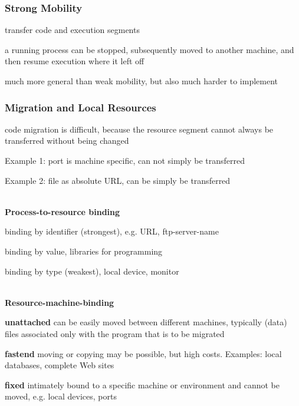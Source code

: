 \subsubsection{Strong Mobility}
\begin{compactitem}
	\item transfer code and execution segments
	\item a running process can be stopped, subsequently moved to another machine, and then resume execution where it left off
	\item much more general than weak mobility, but also much harder to implement
\end{compactitem}

\subsubsection{Migration and Local Resources}

\begin{compactitem}
	\item code migration is difficult, because the resource segment cannot always be transferred without being changed
	\item Example 1: port is machine specific, can not simply be transferred
	\item Example 2: file as absolute URL, can be simply be transferred
\end{compactitem}
\ \\

\textbf{Process-to-resource binding}
\begin{compactenum}
	\item binding by identifier (strongest), e.g. URL, ftp-server-name
	\item binding by value, libraries for programming
	\item binding by type (weakest), local device, monitor
\end{compactenum}
\ \\

\textbf{Resource-machine-binding}
\begin{compactenum}
	\item \textbf{unattached} can be easily moved between different machines, typically (data) files associated only with the program that is to be migrated
	\item \textbf{fastend} moving or copying may be possible, but high costs. Examples: local databases, complete Web sites
	\item \textbf{fixed} intimately bound to a specific machine or environment and cannot be moved, e.g. local devices, ports
\end{compactenum}
\ \\

